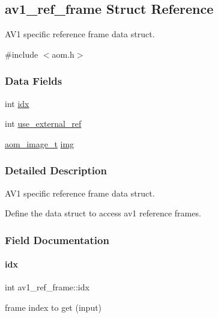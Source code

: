 \hypertarget{structav1__ref__frame}{}\subsection{av1\+\_\+ref\+\_\+frame Struct Reference}
\label{structav1__ref__frame}


A\+V1 specific reference frame data struct.  




{\ttfamily \#include $<$aom.\+h$>$}

\subsubsection*{Data Fields}
\begin{DoxyCompactItemize}
\item 
int \hyperlink{structav1__ref__frame_a7c6fcaba58f514985448cb2e2245345c}{idx}
\item 
int \hyperlink{structav1__ref__frame_a33749c5c20033cc5f7582d0ec1c34ff0}{use\+\_\+external\+\_\+ref}
\item 
\hyperlink{aom__image_8h_a5409ae8fdb326fe1cc32622ef4e23748}{aom\+\_\+image\+\_\+t} \hyperlink{structav1__ref__frame_a55a09db9e1acdd73e656b01fa01283b3}{img}
\end{DoxyCompactItemize}


\subsubsection{Detailed Description}
A\+V1 specific reference frame data struct. 

Define the data struct to access av1 reference frames. 

\subsubsection{Field Documentation}
\mbox{\label{structav1__ref__frame_a7c6fcaba58f514985448cb2e2245345c}} 
\paragraph{\texorpdfstring{idx}{idx}}
{\footnotesize\ttfamily int av1\+\_\+ref\+\_\+frame\+::idx}

frame index to get (input) \mbox{\label{structav1__ref__frame_a33749c5c20033cc5f7582d0ec1c34ff0}} 
